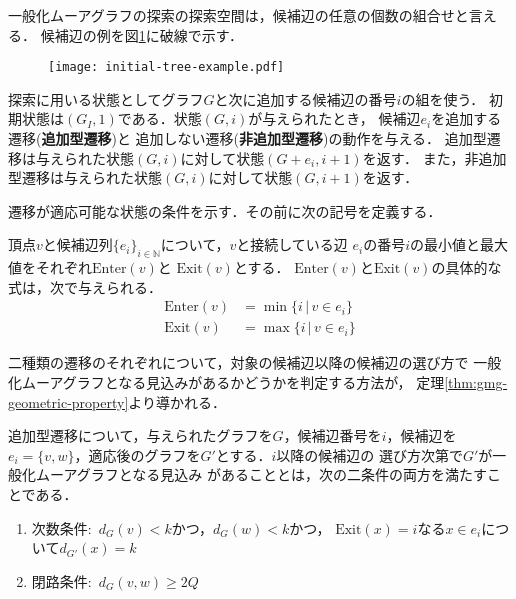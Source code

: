 一般化ムーアグラフの探索の探索空間は，候補辺の任意の個数の組合せと言える．
候補辺の例を図\ref{fig:feasible-edges-example}に破線で示す．

\begin{figure}
  \centering
  \begin{minipage}{.45\columnwidth}
    \texttt{[image: initial-tree-example.pdf]}
    \label{fig:initial-tree-example}
  \end{minipage}
  \hfill
  \begin{minipage}{.45\columnwidth}
    \def\svgwidth{\textwidth}
    
    \label{fig:feasible-edges-example}
  \end{minipage}
\end{figure}

探索に用いる状態としてグラフ$G$と次に追加する候補辺の番号$i$の組を使う．
初期状態は$(G_I,1)$である．状態$(G,i)$が与えられたとき，
候補辺$e_i$を追加する遷移(\textbf{追加型遷移})と
追加しない遷移(\textbf{非追加型遷移})の動作を与える．
追加型遷移は与えられた状態$(G,i)$に対して状態$(G+e_i,i+1)$を返す．
また，非追加型遷移は与えられた状態$(G,i)$に対して状態$(G,i+1)$を返す．

遷移が適応可能な状態の条件を示す．その前に次の記号を定義する．
\begin{definition}\rm
  頂点$v$と候補辺列$\{e_i\}_{i\in\mathbb{N}}$について，$v$と接続している辺
  $e_i$の番号$i$の最小値と最大値をそれぞれ$\text{Enter}(v)$と
  $\text{Exit}(v)$とする．
  $\text{Enter}(v)$と$\text{Exit}(v)$の具体的な式は，次で与えられる．
  \begin{equation}
    \label{eq:frontier}
    \begin{aligned}
    \text{Enter}(v) &= \min\{i\,|\,v\in e_i\} \\
    \text{Exit}(v) &= \max\{i\,|\,v\in e_i\}
    \end{aligned}
  \end{equation}
\end{definition}

二種類の遷移のそれぞれについて，対象の候補辺以降の候補辺の選び方で
一般化ムーアグラフとなる見込みがあるかどうかを判定する方法が，
定理\ref{thm:gmg-geometric-property}より導かれる．

\begin{corollary-without-proof}\rm
  \label{coll:basic-add-transition}
  追加型遷移について，与えられたグラフを$G$，候補辺番号を$i$，候補辺を
  $e_i=\{v,w\}$，適応後のグラフを$G'$とする．$i$以降の候補辺の
  選び方次第で$G'$が一般化ムーアグラフとなる見込み
  があることとは，次の二条件の両方を満たすことである．
  \begin{enumerate}
  \item 次数条件:\ $d_G(v)<k$かつ，$d_G(w)<k$かつ，
    $\text{Exit}(x)=i$なる$x\in e_i$について$d_{G'}(x)=k$
  \item 閉路条件:\ $d_G(v,w)\geq2Q$
  \end{enumerate}
\end{corollary-without-proof}

